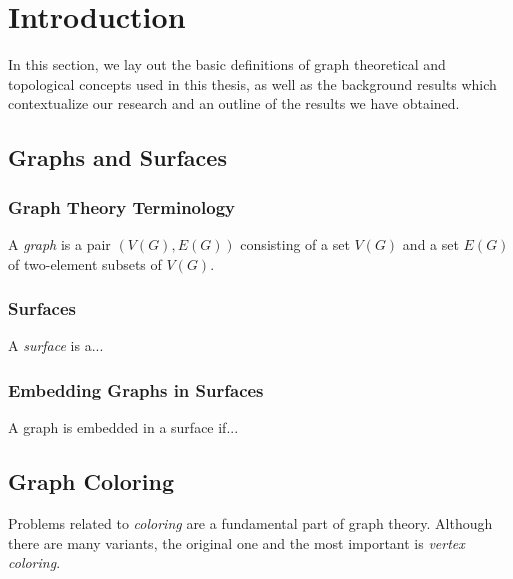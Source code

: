 \section{Introduction}

In this section, we lay out the basic definitions of graph theoretical and topological concepts used in this thesis, as well as the background results which contextualize our research and an outline of the results we have obtained.


\subsection{Graphs and Surfaces}

\subsubsection{Graph Theory Terminology}

A \textit{graph} is a pair $(V(G), E(G))$ consisting of a set $V(G)$ and a set $E(G)$ of two-element subsets of $V(G)$. 


\subsubsection{Surfaces}

A \textit{surface} is a...


\subsubsection{Embedding Graphs in Surfaces}

A graph is embedded in a surface if...





\subsection{Graph Coloring}

Problems related to \emph{coloring} are a fundamental part of graph theory. Although there are many variants, the original one and the most important is \emph{vertex coloring}.


